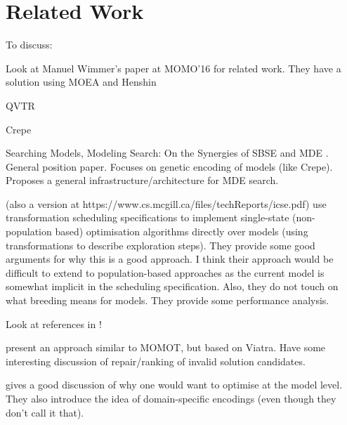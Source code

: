 \section{Related Work}
\label{section:related_work}

	\begin{draftlist}
		To discuss:
		\item Look at Manuel Wimmer's paper at MOMO'16 for related work. They have a solution using MOEA and Henshin
		\item QVTR
		\item Crepe
		\item Searching Models, Modeling Search: On the Synergies of SBSE and MDE \cite{Kessentini+13}. General position paper. Focuses on genetic encoding of models 
		      (like Crepe). Proposes a general infrastructure/architecture for MDE search.
		\item \cite{Denil+14} (also a version at https://www.cs.mcgill.ca/files/techReports/icse.pdf) use transformation scheduling specifications to implement 
		      single-state (non-population based) optimisation algorithms directly over models 
		      (using transformations to describe exploration steps). They provide some good arguments for why this is a good approach. I think their approach would be
					difficult to extend to population-based approaches as the current model is somewhat implicit in the scheduling specification. Also, they do not touch on
					what breeding means for models. They provide some performance analysis.
					
					Look at references in \cite{Denil+14}!
					
		\item \cite{Abdeen+14} present an approach similar to MOMOT, but based on Viatra. Have some interesting discussion of repair/ranking of invalid solution
		      candidates.
					
	  \item \cite{BurtonPoulding13} gives a good discussion of why one would want to optimise at the model level. They also introduce the idea of domain-specific
		      encodings (even though they don't call it that).
	\end{draftlist}
